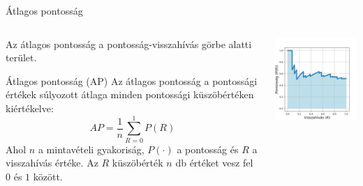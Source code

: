 \documentclass[english, aspectratio=169]{beamer}
\begin{document}
	\begin{frame}{Átlagos pontosság}
		\begin{columns}
			\begin{column}{.5\textwidth}
				Az átlagos pontosság a pontosság-visszahívás görbe alatti terület. 
				\begin{block}{Átlagos pontosság (AP)}
					Az átlagos pontosság a pontossági értékek súlyozott átlaga minden pontossági küszöbértéken kiértékelve:
					\[
					AP = \frac{1}{n} \sum_{R=0}^1 P(R)
					\]
					Ahol $n$ a mintavételi gyakoriság, $P(\cdot)$ a pontosság és $R$ a visszahívás értéke. Az $R$ küszöbérték $n$ db értéket vesz fel $0$ és $1$ között. 
				\end{block}
			\end{column}
			\begin{column}{.5\textwidth}
				\begin{center}
					\includegraphics[width=7cm, keepaspectratio]{images/od_12.png}
				\end{center}
			\end{column}
		\end{columns}
	\end{frame}
	
\end{document}
